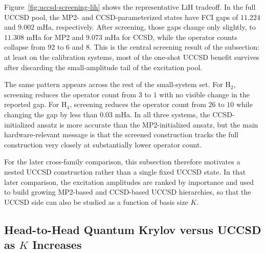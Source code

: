 Figure~\ref{fig:uccsd-screening-lih} shows the representative LiH tradeoff. In the full UCCSD pool, the MP2- and CCSD-parameterized states have FCI gaps of $11.224$ and $9.002$ mHa, respectively. After screening, those gaps change only slightly, to $11.308$ mHa for MP2 and $9.073$ mHa for CCSD, while the operator counts collapse from $92$ to $6$ and $8$. This is the central screening result of the subsection: at least on the calibration systems, most of the one-shot UCCSD benefit survives after discarding the small-amplitude tail of the excitation pool.

The same pattern appears across the rest of the small-system set. For H$_2$, screening reduces the operator count from $3$ to $1$ with no visible change in the reported gap. For H$_4$, screening reduces the operator count from $26$ to $10$ while changing the gap by less than $0.03$ mHa. In all three systems, the CCSD-initialized ansatz is more accurate than the MP2-initialized ansatz, but the main hardware-relevant message is that the screened construction tracks the full construction very closely at substantially lower operator count.

\begin{table}[t]
    \centering
    \small
    
    \caption{Full and screened one-shot UCCSD variants on the small calibration systems. Reported gaps are relative to exact FCI, and `Ops' counts the retained excitation operators.}
    \label{tab:uccsd-screening-summary}
\end{table}

For the later cross-family comparison, this subsection therefore motivates a nested UCCSD construction rather than a single fixed UCCSD state. In that later comparison, the excitation amplitudes are ranked by importance and used to build growing MP2-based and CCSD-based UCCSD hierarchies, so that the UCCSD side can also be studied as a function of basis size $K$.

\subsection{Head-to-Head Quantum Krylov versus UCCSD as $K$ Increases}

